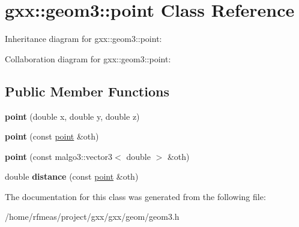 \hypertarget{classgxx_1_1geom3_1_1point}{}\section{gxx\+:\+:geom3\+:\+:point Class Reference}
\label{classgxx_1_1geom3_1_1point}


Inheritance diagram for gxx\+:\+:geom3\+:\+:point\+:


Collaboration diagram for gxx\+:\+:geom3\+:\+:point\+:
\subsection*{Public Member Functions}
\begin{DoxyCompactItemize}
\item 
{\bfseries point} (double x, double y, double z)\hypertarget{classgxx_1_1geom3_1_1point_adbd31ea74e2671a3c58217872435e162}{}\label{classgxx_1_1geom3_1_1point_adbd31ea74e2671a3c58217872435e162}

\item 
{\bfseries point} (const \hyperlink{classgxx_1_1geom3_1_1point}{point} \&oth)\hypertarget{classgxx_1_1geom3_1_1point_a2602f7539ffdfffaf245ba3f6f1d7105}{}\label{classgxx_1_1geom3_1_1point_a2602f7539ffdfffaf245ba3f6f1d7105}

\item 
{\bfseries point} (const malgo3\+::vector3$<$ double $>$ \&oth)\hypertarget{classgxx_1_1geom3_1_1point_a16ba4a85530db4077e309e5c4e638a01}{}\label{classgxx_1_1geom3_1_1point_a16ba4a85530db4077e309e5c4e638a01}

\item 
double {\bfseries distance} (const \hyperlink{classgxx_1_1geom3_1_1point}{point} \&oth)\hypertarget{classgxx_1_1geom3_1_1point_a6e6b9da4e949618442c67667ec385b65}{}\label{classgxx_1_1geom3_1_1point_a6e6b9da4e949618442c67667ec385b65}

\end{DoxyCompactItemize}


The documentation for this class was generated from the following file\+:\begin{DoxyCompactItemize}
\item 
/home/rfmeas/project/gxx/gxx/geom/geom3.\+h\end{DoxyCompactItemize}
